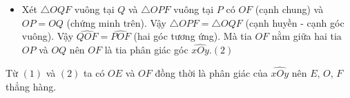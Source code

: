 \begin{bt}
{{
		}
		\begin{itemize}
			\item Xét $\triangle OQF$ vuông tại $Q$ và $\triangle OPF$ vuông tại $P$ có $OF$ (cạnh chung) và $OP=OQ$ (chứng minh trên). Vậy $\triangle OPF=\triangle OQF$ (cạnh huyền - cạnh góc vuông). Vậy $\widehat{QOF}=\widehat{POF}$ (hai góc tương ứng). Mà tia $OF$ nằm giữa hai tia $OP$ và $OQ$ nên $OF$ là tia phân giác góc $\widehat{xOy}$.\hfill $(2)$
		\end{itemize}
		Từ $(1)$ và $(2)$ ta có $OE$ và $OF$ đồng thời là phân giác của $\widehat{xOy}$ nên $E$, $O$, $F$ thẳng hàng.
	}
\end{bt}

